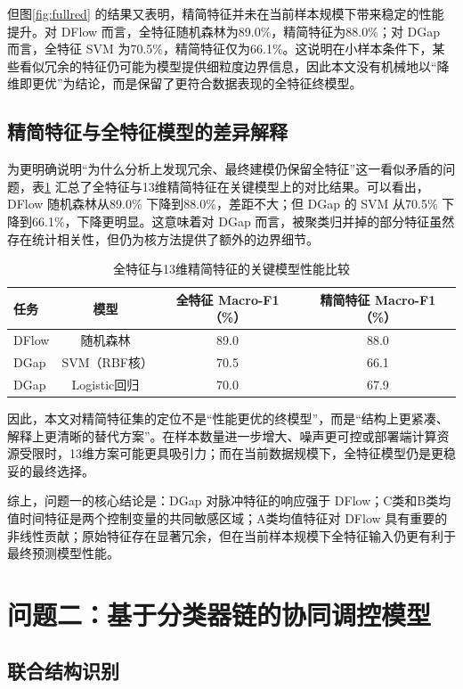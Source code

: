 \documentclass[UTF8,a4paper,12pt]{ctexart}
\begin{document}
但图\ref{fig:fullred} 的结果又表明，精简特征并未在当前样本规模下带来稳定的性能提升。对 DFlow 而言，全特征随机森林为89.0\%，精简特征为88.0\%；对 DGap 而言，全特征 SVM 为70.5\%，精简特征仅为66.1\%。这说明在小样本条件下，某些看似冗余的特征仍可能为模型提供细粒度边界信息，因此本文没有机械地以“降维即更优”为结论，而是保留了更符合数据表现的全特征终模型。

\subsection{精简特征与全特征模型的差异解释}

为更明确说明“为什么分析上发现冗余、最终建模仍保留全特征”这一看似矛盾的问题，表\ref{tab:fullred} 汇总了全特征与13维精简特征在关键模型上的对比结果。可以看出，DFlow 随机森林从89.0\% 下降到88.0\%，差距不大；但 DGap 的 SVM 从70.5\% 下降到66.1\%，下降更明显。这意味着对 DGap 而言，被聚类归并掉的部分特征虽然存在统计相关性，但仍为核方法提供了额外的边界细节。

\begin{table}[H]
\centering
\caption{全特征与13维精简特征的关键模型性能比较}
\label{tab:fullred}
\begin{tabular}{lccc}
\toprule
任务 & 模型 & 全特征 Macro-F1（\%） & 精简特征 Macro-F1（\%） \\
\midrule
DFlow & 随机森林 & 89.0 & 88.0 \\
DGap & SVM（RBF核） & 70.5 & 66.1 \\
DGap & Logistic回归 & 70.0 & 67.9 \\
\bottomrule
\end{tabular}
\end{table}

因此，本文对精简特征集的定位不是“性能更优的终模型”，而是“结构上更紧凑、解释上更清晰的替代方案”。在样本数量进一步增大、噪声更可控或部署端计算资源受限时，13维方案可能更具吸引力；而在当前数据规模下，全特征模型仍是更稳妥的最终选择。

综上，问题一的核心结论是：DGap 对脉冲特征的响应强于 DFlow；C类和B类均值时间特征是两个控制变量的共同敏感区域；A类均值特征对 DFlow 具有重要的非线性贡献；原始特征存在显著冗余，但在当前样本规模下全特征输入仍更有利于最终预测模型性能。

\section{问题二：基于分类器链的协同调控模型}

\subsection{联合结构识别}
\end{document}
